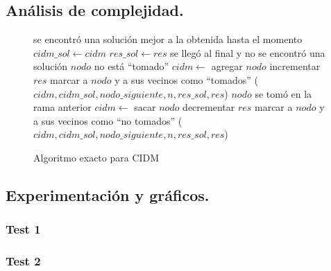 \vspace*{0.6cm}


\subsection{Análisis de complejidad.}

\vspace*{0.3cm}

\begin{figure}
\begin{codebox}
\li \If se encontró una solución mejor a la obtenida hasta el momento
\li \Then 
 		$cidm\_sol \leftarrow cidm$
\li 		$res\_sol \leftarrow res$ 		
\li 		\Return
	\End
\li \If se llegó al final y no se encontró una solución
\li \Then \Return
	\End
\li \If $nodo$ no está ``tomado''	
\li \Then
		$cidm \leftarrow$ agregar $nodo$
\li 		incrementar $res$
\li 		marcar a $nodo$ y a sus vecinos como ``tomados''
($cidm,cidm\_sol,nodo\_siguiente,n,res\_sol,res$)
	\End
\li 	\If $nodo$ se tomó en la rama anterior
\li 	\Then
		$cidm \leftarrow$ sacar $nodo$
\li		decrementar $res$
\li 		marcar a $nodo$ y a sus vecinos como ``no tomados''
	\End
{}($cidm,cidm\_sol,nodo\_siguiente,n,res\_sol,res$)
\end{codebox}
\caption{Algoritmo exacto para CIDM}\label{code:exacto}
\end{figure}


\vspace*{0.6cm}
\subsection{Experimentación y gráficos.}

\vspace*{0.3cm}


\subsubsection{Test 1}
\vspace*{0.3cm}

\vspace*{0.6cm}

\subsubsection{Test 2}

